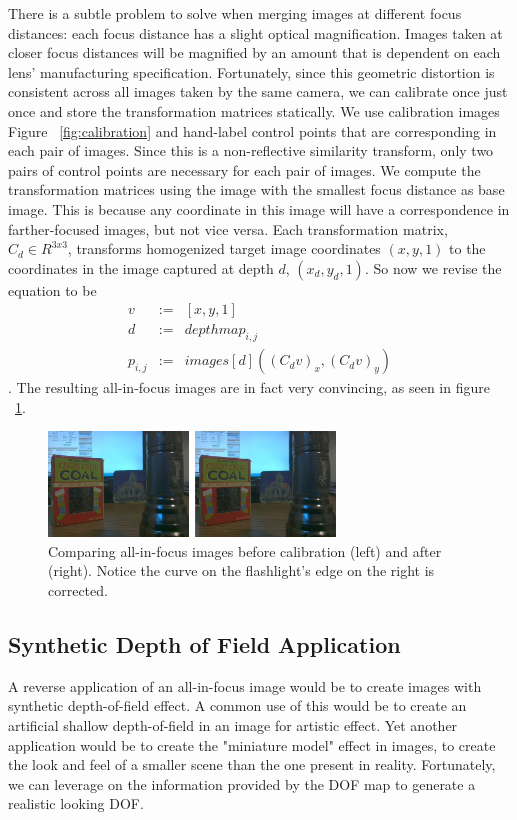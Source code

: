 \documentclass[annual]{acmsiggraph}
\begin{document}
There is a subtle problem to solve when merging images at different focus distances: each focus distance has a slight optical magnification.  Images taken at closer focus distances will be magnified by an amount that is dependent on each lens' manufacturing specification.  Fortunately, since this geometric distortion is consistent across all images taken by the same camera, we can calibrate once just once and store the transformation matrices statically. We use calibration images Figure ~\ref{fig:calibration} and hand-label control points that are corresponding in each pair of images. Since this is a non-reflective similarity transform, only two pairs of control points are necessary for each pair of images.  We compute the transformation matrices using the image with the smallest focus distance as base image.  This is because any coordinate in this image will have a correspondence in farther-focused images, but not vice versa.  Each transformation matrix, $C_d\in R^{3x3}$, transforms homogenized target image coordinates $(x,y,1)$ to the coordinates in the image captured at depth $d$, $(x_d,y_d,1)$. So now we revise the equation to be
\begin{eqnarray} 
v &:=& [x,y,1] \nonumber \\
d &:=& depthmap_{i,j}  \nonumber \\
p_{i,j} &:=& images[ d ]( (C_d v)_x, (C_d v)_y)
\end{eqnarray}. The resulting all-in-focus images are in fact very convincing, as seen in figure ~\ref{fig:all-focus-calibrated}.

\begin{figure}
\centering
\includegraphics[width=3in]{images/all-focus-calibrated.jpg}
\caption{Comparing all-in-focus images before calibration (left) and after (right). Notice the curve on the flashlight's edge on the right is corrected.}
\label{fig:all-focus-calibrated}
\end{figure}


\subsection{Synthetic Depth of Field Application}

A reverse application of an all-in-focus image would be to create images with synthetic depth-of-field effect. A common use of this would be 
to create an artificial shallow depth-of-field in an image for artistic effect. Yet another application would be to create the "miniature model" effect
in images, to create the look and feel of a smaller scene than the one present in reality. Fortunately, we can leverage on the information provided
by the DOF map to generate a realistic looking DOF. 
\end{document}
